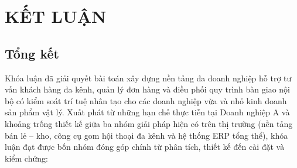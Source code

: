 \chapter{KẾT LUẬN}\label{chap:conclusion}

\section{Tổng kết}
Khóa luận đã giải quyết bài toán xây dựng nền tảng đa doanh nghiệp hỗ trợ tư vấn khách hàng đa kênh, quản lý đơn hàng và điều phối quy trình bàn giao nội bộ có kiểm soát trí tuệ nhân tạo cho các doanh nghiệp vừa và nhỏ kinh doanh sản phẩm vật lý. Xuất phát từ những hạn chế thực tiễn tại Doanh nghiệp A và khoảng trống thiết kế giữa ba nhóm giải pháp hiện có trên thị trường (nền tảng bán lẻ -- kho, công cụ gom hội thoại đa kênh và hệ thống ERP tổng thể), khóa luận đạt được bốn nhóm đóng góp chính từ phân tích, thiết kế đến cài đặt và kiểm chứng:

